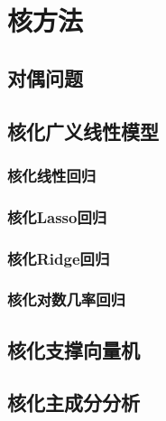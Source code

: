 \chapter{核方法} %
\label{cha:核方法_}
\section{对偶问题} %
\label{sec:对偶问题}



\section{核化广义线性模型} %
\label{sec:核化广义线性模型}
\subsection{核化线性回归} %
\label{sub:核化线性回归}

\subsection{核化Lasso回归} %
\label{sub:核化lasso回归}

\subsection{核化Ridge回归} %
\label{sub:核化ridge回归}

\subsection{核化对数几率回归} %
\label{sub:核化对数几率回归}




\section{核化支撑向量机} %
\label{sec:核化支撑向量机}


\section{核化主成分分析} %
\label{sec:核化主成分分析}





